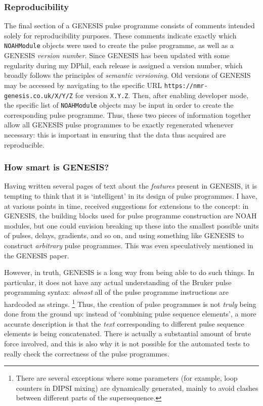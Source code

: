 \subsubsection{Reproducibility}

The final section of a GENESIS pulse programme consists of comments intended solely for reproducibility purposes.
These comments indicate exactly which \texttt{NOAHModule} objects were used to create the pulse programme, as well as a GENESIS \textit{version number}.
Since GENESIS has been updated with some regularity during my DPhil, each release is assigned a version number, which broadly follows the principles of \textit{semantic versioning}.
Old versions of GENESIS may be accessed by navigating to the specific URL \texttt{https://nmr-genesis.co.uk/X/Y/Z} for version \texttt{X.Y.Z}.
Then, after enabling developer mode, the specific list of \texttt{NOAHModule} objects may be input in order to create the corresponding pulse programme.
Thus, these two pieces of information together allow all GENESIS pulse programmes to be exactly regenerated whenever necessary: this is important in ensuring that the data thus acquired are reproducible.


\subsubsection{How smart is GENESIS?}

Having written several pages of text about the \textit{features} present in GENESIS, it is tempting to think that it is `intelligent' in its design of pulse programmes.
I have, at various points in time, received suggestions for extensions to the concept: in GENESIS, the building blocks used for pulse programme construction are NOAH modules, but one could envision breaking up these into the smallest possible units of pulses, delays, gradients, and so on, and using something like GENESIS to construct \textit{arbitrary} pulse programmes.
This was even speculatively mentioned in the GENESIS paper\autocite{Yong2022AC}.

However, in truth, GENESIS is a long way from being able to do such things.
In particular, it does not have any actual understanding of the Bruker pulse programming syntax: \textit{almost} all of the pulse programme instructions are hardcoded as strings.%
\footnote{There are several exceptions where some parameters (for example, loop counters in DIPSI mixing) are dynamically generated, mainly to avoid clashes between different parts of the supersequence.}
Thus, the creation of pulse programmes is not \textit{truly} being done from the ground up: instead of `combining pulse sequence elements', a more accurate description is that the \textit{text} corresponding to different pulse sequence elements is being concatenated.
There is actually a substantial amount of brute force involved, and this is also why it is not possible for the automated tests to really check the correctness of the pulse programmes.

